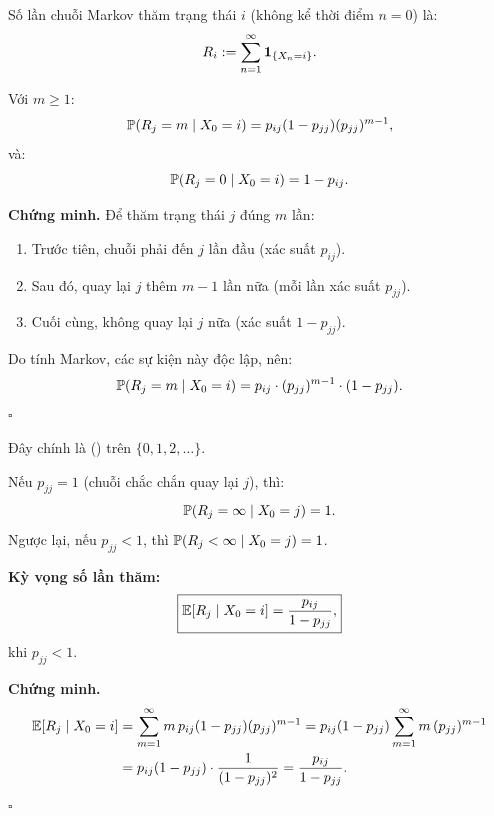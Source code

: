 \begin{dinhnghia}
Số lần chuỗi Markov thăm trạng thái $i$ (không kể thời điểm $n=0$) là:
\[
  R_i := \sum_{n=1}^{\infty} \mathbf{1}_{\{X_n = i\}}.
\]
\end{dinhnghia}

\begin{dinhly}
\label{thm:num-visits}
Với $m \geq 1$:
\begin{equation}\label{eq:num-visits}
  \mathbb{P}(R_j = m \mid X_0 = i) = p_{ij}(1 - p_{jj})(p_{jj})^{m-1},
\end{equation}
và:
\[
  \mathbb{P}(R_j = 0 \mid X_0 = i) = 1 - p_{ij}.
\]
\end{dinhly}

\textbf{Chứng minh.}
Để thăm trạng thái $j$ đúng $m$ lần:
\begin{enumerate}[nosep]
  \item Trước tiên, chuỗi phải đến $j$ lần đầu (xác suất $p_{ij}$).
  \item Sau đó, quay lại $j$ thêm $m-1$ lần nữa (mỗi lần xác suất $p_{jj}$).
  \item Cuối cùng, không quay lại $j$ nữa (xác suất $1 - p_{jj}$).
\end{enumerate}
Do tính Markov, các sự kiện này độc lập, nên:
\[
  \mathbb{P}(R_j = m \mid X_0 = i) = p_{ij} \cdot (p_{jj})^{m-1} \cdot (1 - p_{jj}).
\]
\hfill$\square$

Đây chính là  () trên $\{0, 1, 2, \ldots\}$.

\begin{dinhly}[(Trường hợp $p_{jj} = 1$)]
Nếu $p_{jj} = 1$ (chuỗi chắc chắn quay lại $j$), thì:
\[
  \mathbb{P}(R_j = \infty \mid X_0 = j) = 1.
\]
Ngược lại, nếu $p_{jj} < 1$, thì $\mathbb{P}(R_j < \infty \mid X_0 = j) = 1$.
\end{dinhly}

\begin{congthuc}
\textbf{Kỳ vọng số lần thăm:}
\[
  \boxed{
    \mathbb{E}[R_j \mid X_0 = i] = \frac{p_{ij}}{1 - p_{jj}},
  }
\]
khi $p_{jj} < 1$.
\end{congthuc}

\textbf{Chứng minh.}
\begin{align*}
  \mathbb{E}[R_j \mid X_0 = i]
  &= \sum_{m=1}^{\infty} m\, p_{ij}(1-p_{jj})(p_{jj})^{m-1}
  = p_{ij}(1-p_{jj}) \sum_{m=1}^{\infty} m\, (p_{jj})^{m-1}\\
  &= p_{ij}(1-p_{jj}) \cdot \frac{1}{(1-p_{jj})^2}
  = \frac{p_{ij}}{1 - p_{jj}}.
\end{align*}
\hfill$\square$

